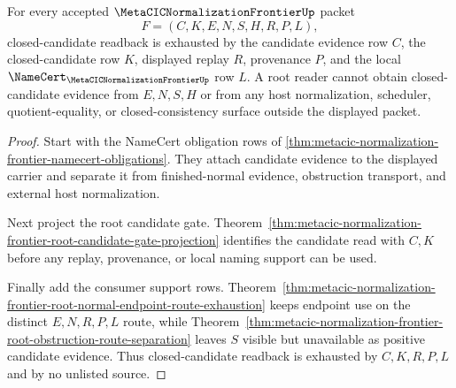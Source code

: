 \begin{theorem}
\label{thm:metacic-normalization-frontier-closed-candidate-readback-exhaustion}
For every accepted $\MetaCICNormalizationFrontierUp$ packet
$$
F=(C,K,E,N,S,H,R,P,L),
$$
closed-candidate readback is exhausted by the candidate evidence row $C$, the closed-candidate row $K$, displayed replay $R$, provenance $P$, and the local $\NameCert_{\MetaCICNormalizationFrontierUp}$ row $L$. A root reader cannot obtain closed-candidate evidence from $E,N,S,H$ or from any host normalization, scheduler, quotient-equality, or closed-consistency surface outside the displayed packet.
\end{theorem}
\begin{proof}
Start with the NameCert obligation rows of \autoref{thm:metacic-normalization-frontier-namecert-obligations}. They attach candidate evidence to the displayed carrier and separate it from finished-normal evidence, obstruction transport, and external host normalization.

Next project the root candidate gate. Theorem~\ref{thm:metacic-normalization-frontier-root-candidate-gate-projection} identifies the candidate read with $C,K$ before any replay, provenance, or local naming support can be used.

Finally add the consumer support rows. Theorem~\ref{thm:metacic-normalization-frontier-root-normal-endpoint-route-exhaustion} keeps endpoint use on the distinct $E,N,R,P,L$ route, while Theorem~\ref{thm:metacic-normalization-frontier-root-obstruction-route-separation} leaves $S$ visible but unavailable as positive candidate evidence. Thus closed-candidate readback is exhausted by $C,K,R,P,L$ and by no unlisted source.
\end{proof}

